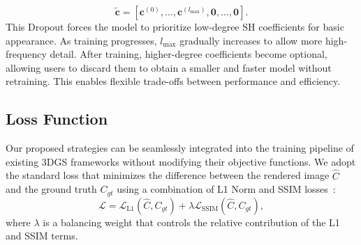 \begin{equation}
\tilde{\mathbf{c}} = [\mathbf{c}^{(0)}, \dots, \mathbf{c}^{(l_\text{max})}, \mathbf{0}, \dots, \mathbf{0}].
\end{equation}
%
This Dropout forces the model to prioritize low-degree SH coefficients for basic appearance. As training progresses, $l_\text{max}$ gradually increases to allow more high-frequency detail. After training, higher-degree coefficients become optional, allowing users to discard them to obtain a smaller and faster model without retraining. This enables flexible trade-offs between performance and efficiency.


\subsection{Loss Function}
Our proposed strategies can be seamlessly integrated into the training pipeline of existing 3DGS frameworks without modifying their objective functions. We adopt the standard loss that minimizes the difference between the rendered image $\hat{C}$ and the ground truth $C_{gt}$ using a combination of L1 Norm and SSIM losses~\cite{kerbl2023-3dgs}:
\begin{equation}
    \mathcal{L} = \mathcal{L}_{\text{L1}}(\hat{C}, C_{gt}) + \lambda \mathcal{L}_{\text{SSIM}}(\hat{C}, C_{gt}),
    \label{eq:loss}
\end{equation}
%
where $\lambda$ is a balancing weight that controls the relative contribution of the L1 and SSIM terms.



